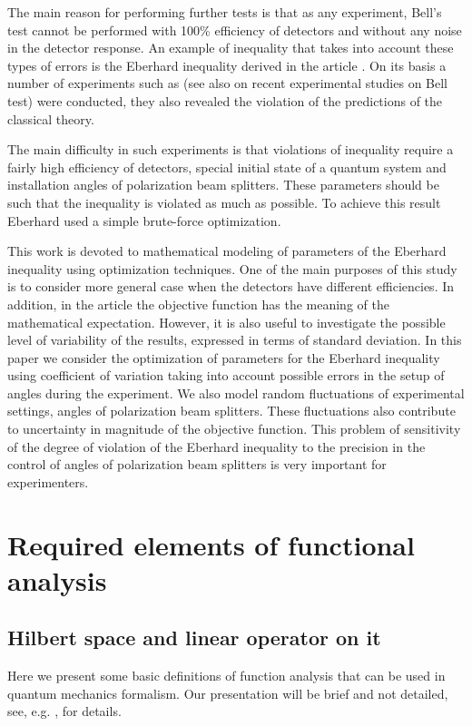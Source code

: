 \documentclass[%
master,         %
subf,           %
href,           %
colorlinks=true %
]{disser}
\numberwithin{equation}{section}
\numberwithin{figure}{section}
\begin{document}
The main reason for performing further tests is that as any experiment, Bell's test cannot be performed with 100\% efficiency of detectors and without any noise in the detector response. An example of inequality that takes into account these types of errors is the Eberhard inequality derived in the article \cite{Eberhard}. On its basis a number of experiments such as \cite{Zeilinger}(see also \cite{Kwiat1, Kwiat2} on recent experimental studies on Bell test) were conducted, they also revealed the violation of the predictions of the classical theory.

The main difficulty in such experiments is that violations of inequality require a fairly high efficiency of detectors, special initial state of a quantum system and installation angles of polarization beam splitters. These parameters should be such that the inequality is violated as much as possible. To achieve this result Eberhard used a simple brute-force optimization.

This work is devoted to mathematical modeling of parameters of the Eberhard inequality using optimization techniques. One of the main purposes of this study is to consider more general case when the detectors have different efficiencies. In addition, in the article \cite{Eberhard} the objective function has the meaning of the mathematical expectation. However, it is also useful to investigate the possible level of variability of the results, expressed in terms of standard deviation. In this paper we consider the optimization of parameters for the Eberhard inequality using coefficient of variation taking into account possible errors in the setup of angles during the experiment. We also model random fluctuations of experimental settings, angles of polarization beam splitters. These fluctuations also contribute to uncertainty in magnitude of the objective function. This problem of sensitivity of the degree of violation of the Eberhard inequality to the precision in the control of angles of polarization beam splitters is very important for experimenters.  

\section{Required elements of functional analysis}
\subsection{Hilbert space and linear operator on it}
Here we present some basic definitions of function analysis that can be used in quantum mechanics formalism. Our presentation will be brief and not detailed, see, e.g. \cite{advanced_la}, for details.
\end{document}
